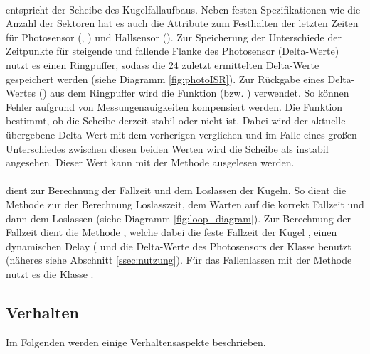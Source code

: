 \paragraph{} entspricht der Scheibe des Kugelfallaufbaus.
Neben festen Spezifikationen wie die Anzahl der Sektoren hat es auch die Attribute zum Festhalten der letzten Zeiten für Photosensor  (, ) und Hallsensor (). 
Zur Speicherung der Unterschiede der Zeitpunkte für steigende und fallende Flanke des Photosensor (Delta-Werte) nutzt es einen Ringpuffer, sodass die 24 zuletzt ermittelten Delta-Werte gespeichert werden (siehe Diagramm \ref{fig:photoISR}).
Zur Rückgabe eines Delta-Wertes () aus dem Ringpuffer wird die Funktion  (bzw. ) verwendet.
So können Fehler aufgrund von Messungenauigkeiten kompensiert werden.
Die Funktion  bestimmt, ob die Scheibe derzeit stabil oder nicht ist.
Dabei wird der aktuelle übergebene Delta-Wert mit dem vorherigen verglichen und im Falle eines großen Unterschiedes zwischen diesen beiden Werten wird die Scheibe als instabil angesehen.
Dieser Wert kann mit der Methode  ausgelesen werden.

\paragraph{} dient zur Berechnung der Fallzeit und dem Loslassen der Kugeln.
So dient die Methode  zur der Berechnung Loslasszeit, dem Warten auf die korrekt Fallzeit und dann dem Loslassen (siehe Diagramm \ref{fig:loop_diagram}).
Zur Berechnung der Fallzeit dient die Methode , welche dabei die feste Fallzeit der Kugel , einen dynamischen Delay ( und die Delta-Werte des Photosensors der Klasse  benutzt (näheres siehe Abschnitt \ref{ssec:nutzung}).
Für das Fallenlassen mit der Methode  nutzt es die Klasse .

\subsection{Verhalten}
Im Folgenden werden einige Verhaltensaspekte beschrieben.

